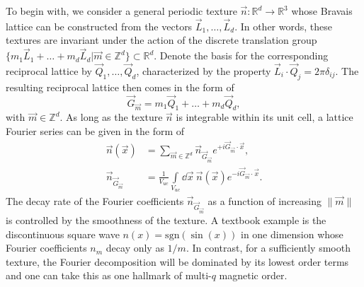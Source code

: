 \documentclass[submission, Phys]{SciPost}
\begin{document}
To begin with, we consider a general periodic texture $\vec{n}\colon \mathbb{R}^d\to \mathbb{R}^3$ whose Bravais lattice can be constructed from the vectors $\vec{L}_1, \ldots, \vec{L}_d$. 
In other words, these textures are invariant under the action of the discrete translation group $\{m_1 \vec{L}_1 + \ldots  + m_d \vec{L}_d| \vec{m}\in\mathbb{Z}^d\} \subset \mathbb{R}^d$.
Denote the basis for the corresponding reciprocal lattice by 
$\vec{Q}_1, \ldots, \vec{Q}_d$, characterized by the property $\vec{L}_i \cdot \vec{Q}_j = 2\pi \delta_{ij}$. 
The resulting reciprocal lattice then comes in the form of
\begin{equation}
    \vec{G}_{\vec{m}} = m_1 \vec{Q}_1 + \ldots  + m_d \vec{Q}_d,
    \label{eq:Gm_definition}
\end{equation}
with $\vec{m} \in \mathbb{Z}^d$.
As long as the texture $\vec{n}$ is integrable within its unit cell, a lattice Fourier series can be given in the form  of
\begin{align}
  \vec{n}(\vec{x}) & =  \sum_{\vec{m} \in  \mathbb{Z}^d}  \vec{n}_{ \vec{G}_{\vec{m}}} e^{+ i  \vec{G}_{\vec{m}} \cdot \vec{x} },
  \\
   \vec{n}_{ \vec{G}_{\vec{m}}} & = \frac{1}{V_{uc}} \int\limits_{ V_{uc}} \dd \vec{x} ~ \vec{n}(\vec{x} ) e^{- i  \vec{G}_{\vec{m}} \cdot \vec{x} } .
\end{align}
The decay rate of the Fourier coefficients $\vec{n}_{ \vec{G}_{\vec{m}}}$ as a function of increasing $\| \vec{m} \|$ is controlled by the smoothness of the texture.
A textbook example is the discontinuous square wave $n(x) = \mathrm{sgn}(\sin (x) )$ in one dimension whose Fourier coefficients $n_m$ decay only as $1/m$.
In contrast, for a sufficiently smooth texture, the Fourier decomposition will be dominated by its lowest order terms and one can take this as one hallmark of multi-$q$ magnetic order.
\end{document}
